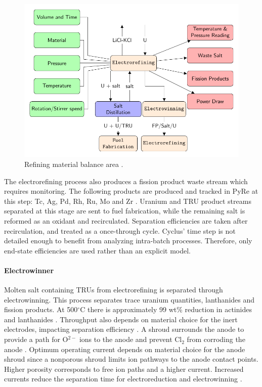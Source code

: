 \begin{figure}
	\centering
	\includegraphics[width=0.85\linewidth]{images/refining}
	\caption{Refining material balance area \cite{lee_advanced_2008}.}
	\label{fig:refining}
\end{figure}

The electrorefining process also produces a fission product waste stream which requires monitoring. 
The following products are produced and tracked in \gls{PyRe} at this step: Tc, Ag, Pd, Rh, Ru, Mo and Zr \cite{flowsheet_1998}. 
Uranium and \gls{TRU} product streams separated at this stage are sent to fuel fabrication, while the remaining salt is reformed as an oxidant and recirculated.
Separation efficiencies are taken after recirculation, and treated as a once-through cycle. Cyclus' time step
is not detailed enough to benefit from analyzing intra-batch processes. Therefore, only end-state efficiencies are used rather than an explicit model.

\paragraph{Electrowinner}

Molten salt containing \glspl{TRU} from electrorefining is separated through electrowinning. This process separates trace uranium quantities, lanthanides and fission products. 
At 500$^{\circ}$C there is approximately 99 wt\% reduction in actinides and lanthanides \cite{flowsheet_1998}. 
Throughput also depends on material choice for the inert electrodes, impacting separation 
efficiency \cite{koyama_development_2012}. A shroud surrounds the anode to provide a path for O$^{2-}$ ions to the anode and 
prevent Cl$_2$ from corroding the anode \cite{kim_development_2013,choi_electrochemical_2015}. Optimum operating current 
depends on material choice for the anode shroud since a nonporous shroud limits ion pathways to the anode contact points.
Higher porosity corresponds to free ion paths and a higher current. Increased currents reduce the separation time for electroreduction and electrowinning \cite{choi_electrochemical_2015}.

